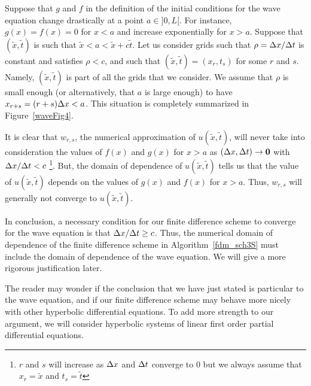 
Suppose that $g$ and $f$ in the definition of the initial conditions
for the wave equation change drastically at a point $a \in ]0, L[$.
For instance, $g(x) = f(x) = 0$ for $x < a$ and increase exponentially
for $x>a$.  Suppose that $(\tilde{x},\tilde{t})$ is such that
$\tilde{x} < a < \tilde{x} + c \tilde{t}$.  Let us consider
grids such that $\rho = \Delta{x}/\Delta{t}$ is constant and satisfies
$\rho < c$, and such that $(\tilde{x},\tilde{t}) = (x_r,t_s)$ for some
$r$ and $s$.  Namely, $(\tilde{x},\tilde{t})$ is part of all the grids
that we consider.  We assume that $\rho$ is small enough (or
alternatively, that $a$ is large enough) to have
$x_{r+s} = (r+s)\Delta{x} < a$.   This situation is completely summarized in
Figure~\ref{waveFig4}.


It is clear that $w_{r,s}$, the numerical approximation of
$u(\tilde{x},\tilde{t})$, will never take into consideration the
values of $f(x)$ and $g(x)$ for $x>a$ as $(\Delta{x},\Delta{t}) \to \bm{0}$
with $\Delta{x}/\Delta{t} < c$ \footnote{$r$ and
$s$ will increase as $\Delta{x}$ and $\Delta{t}$ converge to $0$ but we
always assume that $x_r = \tilde{x}$ and $t_s = \tilde{t}$}.  But,
the domain of dependence of $u(\tilde{x},\tilde{t})$ tells us that the
value of $u(\tilde{x},\tilde{t})$ depends on the values of $g(x)$ and
$f(x)$ for $x>a$.  Thus, $w_{r,s}$ will generally not converge
to $u(\tilde{x},\tilde{t})$.

In conclusion, a necessary condition for our finite difference scheme
to converge for the wave equation is that $\Delta{x}/\Delta{t} \geq c$.
Thus, the numerical domain of dependence of the finite difference
scheme in Algorithm~\ref{fdm_sch3S} must include the domain of
dependence of the wave equation.  We will give a more rigorous
justification later.

The reader may wonder if the conclusion that we have just stated is
particular to the wave equation, and if our finite difference scheme
may behave more nicely with other hyperbolic differential equations.
To add more strength to our argument, we will consider hyperbolic
systems of linear first order partial differential equations.

